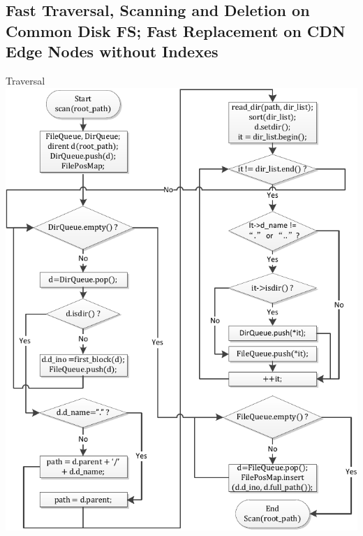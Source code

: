\documentclass{beamer}
\begin{document}
\subsection{Fast Traversal, Scanning and Deletion on Common Disk FS; Fast Replacement on CDN Edge Nodes without Indexes}
\begin{frame}{Traversal}
\includegraphics[scale=0.4]{fig/fs_traversal.pdf}\hspace*{0.1cm}

\end{frame}
\end{document}
